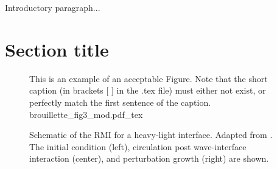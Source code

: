 Introductory paragraph...
\section{Section title}
\begin{figure}
  This is an example of an acceptable Figure. Note that the short
  caption (in brackets [ ] in the .tex file) must either not exist,
  or perfectly match the first sentence of the caption.%
  \centering
  \def\svgwidth{0.9\textwidth}
  {brouillette_fig3_mod.pdf_tex} \hfill%
  \caption[Schematic of the \acl{RMI} for a heavy-light
  interface]{Schematic of the \acl{RMI} for a heavy-light
    interface. Adapted from \cite{Brouillette2002}. The initial
    condition (left), circulation post wave-interface interaction
    (center), and perturbation growth (right) are shown.}%
  \label{fig:rmi_schematic}
\end{figure}



